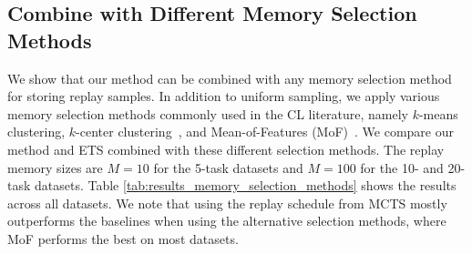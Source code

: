 
\begin{table}[t]
	\footnotesize
	\centering
	\caption{
		Performance comparison with ACC between MCTS (Ours), Random scheduling (Random), Equal Task Schedule (ETS), and Heuristic Scheduling (Heuristic) with various memory selection methods evaluated across all datasets. We provide the metrics for training on all seen task datasets jointly (Joint) as an upper bound, as well as include the results from a breadth-first search (BFS) with Uniform memory selection for the 5-task datasets. 
		Replay memory sizes are $M=10$ and $M=100$ for the 5-task and 10/20-task datasets respectively. We report the mean and standard deviation averaged over 5 seeds. Ours performs better or on par with the baselines on most datasets and selection methods, where MoF yields the best results %
		in general.
	}
	\vspace{-3mm}
	\resizebox{0.98\textwidth}{!}{ %
			
		}
		\vspace{-3mm}
		\label{tab:results_memory_selection_methods}
	\end{table}

%
\subsection{Combine with Different Memory Selection Methods}
\label{paperC:sec:alternative_memory_selection_methods}

We show that our method can be combined with any memory selection method for storing replay samples. In addition to uniform sampling, we apply various memory selection methods commonly used in the CL literature, namely $k$-means clustering, $k$-center clustering~, and Mean-of-Features (MoF)~. We compare our method and ETS combined with these different selection methods. 
The replay memory sizes are $M=10$ for the 5-task datasets and $M=100$ for the 10- and 20-task datasets.  
Table \ref{tab:results_memory_selection_methods} shows the results across all datasets. 
We note that using the replay schedule from MCTS mostly outperforms the baselines when using the alternative selection methods, where MoF performs the best on most datasets. 


